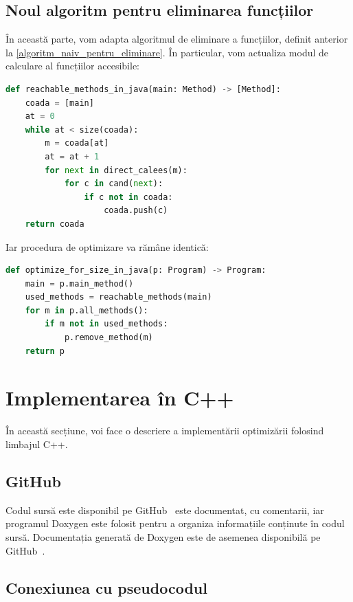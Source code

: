 \subsection{Noul algoritm pentru eliminarea funcțiilor}

În această parte, vom adapta algoritmul de eliminare a funcțiilor, definit
anterior la \ref{algoritm_naiv_pentru_eliminare}.
În particular, vom actualiza modul de calculare al funcțiilor accesibile:

\begin{lstlisting}[language=Python, label=reachable_methods_in_java]
def reachable_methods_in_java(main: Method) -> [Method]:
    coada = [main]
    at = 0
    while at < size(coada):
        m = coada[at]
        at = at + 1
        for next in direct_calees(m):
            for c in cand(next):
                if c not in coada:
                    coada.push(c)
    return coada
\end{lstlisting}


Iar procedura de optimizare va rămâne identică:

\begin{lstlisting}[language=Python, label=optimize_for_size_in_java]
def optimize_for_size_in_java(p: Program) -> Program:
    main = p.main_method()
    used_methods = reachable_methods(main)
    for m in p.all_methods():
        if m not in used_methods:
            p.remove_method(m)
    return p
\end{lstlisting}

\section{Implementarea în C++}

În această secțiune, voi face o descriere a implementării optimizării folosind
limbajul C++.

\subsection{GitHub}

Codul sursă este disponibil pe GitHub~\cite{project_sourcecode} este documentat,
cu comentarii, iar programul Doxygen este folosit pentru a organiza informațiile
conținute în codul sursă. Documentația generată de Doxygen este de asemenea
disponibilă pe GitHub~\cite{project_doxygen}.

\subsection{Conexiunea cu pseudocodul}


